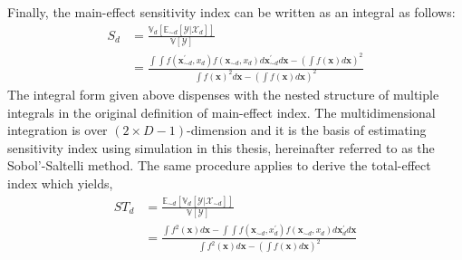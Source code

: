 Finally, the main-effect sensitivity index can be written as an integral as follows:
\begin{equation}
  \begin{split}
    S_d & = \frac{\mathbb{V}_d [\mathbb{E}_{\sim d} [\mathcal{Y}|\mathcal{X}_d]]}{\mathbb{V}[\mathcal{Y}]} \\
        & = \frac{\int \int f(\bm{x}^{\prime}_{\sim d}, x_d) f(\bm{x}_{\sim d}, x_d) d\bm{x}^{\prime}_{\sim d} d\bm{x} - \left(\int f(\bm{x}) d\bm{x}\right)^2}{\int f(\bm{x})^2 d\bm{x} - \left( \int f(\bm{x}) d\bm{x}\right)^2}
  \end{split}
\label{eq:ss_main_effect_integral}
\end{equation}
The integral form given above dispenses with the nested structure of multiple integrals in the original definition of main-effect index.
The multidimensional integration is over $(2 \times D - 1)$-dimension
and it is the basis of estimating sensitivity index using  simulation in this thesis, hereinafter referred to as the Sobol'-Saltelli method.
The same procedure applies to derive the total-effect index which yields,
\begin{equation}
  \begin{split}
    ST_d & = \frac{\mathbb{E}_{\sim d}[\mathbb{V}_{d}[\mathcal{Y}|\bm{\mathcal{X}}_{\sim d}]]}{\mathbb{V}[\mathcal{Y}]} \\
        & = \frac{\int f^2(\bm{x}) d\bm{x} - \int \int f(\bm{x}_{\sim d}, x^{\prime}_d) f(\bm{x}_{\sim d}, x_d) d\bm{x}^{\prime}_{d} d\bm{x}}{\int f^2(\bm{x}) d\bm{x} - \left( \int f(\bm{x}) d\bm{x}\right)^2}
  \end{split}
\label{eq:ss_total_effect_integral}
\end{equation}